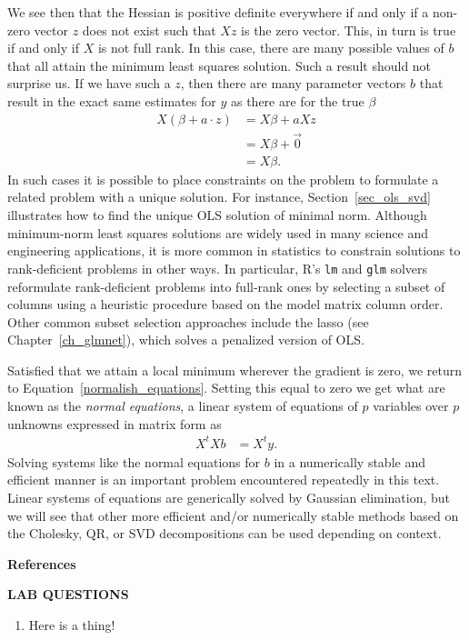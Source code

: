 \documentclass[12pt,hidelinks]{article}
\newcommand{\code}[1]{\texttt{#1}}
\numberwithin{equation}{section}
\begin{document}
We see then that the Hessian is positive definite everywhere if
and only if a non-zero vector $z$ does not exist such that $Xz$
is the zero vector. This, in turn is true if and only if $X$ is not
full rank. In this case, there are many possible values of $b$ that
all attain the minimum least squares solution. Such a result should
not surprise us. If we have such a $z$, then there are many parameter
vectors $b$ that result in the exact same estimates for $y$ as there
are for the true $\beta$
\begin{align}
X (\beta + a \cdot z) &= X \beta + a X z \\
&= X \beta + \vec{0} \\
&= X \beta.
\end{align}
In such cases it is
possible to place constraints on the problem to formulate a related
problem with a unique solution. For instance, Section~\ref{sec_ols_svd}
illustrates how to find the unique OLS solution of minimal norm.
Although minimum-norm least squares solutions are widely used in many science
and engineering applications, it is more common in statistics to constrain
solutions to rank-deficient problems in other ways. In particular, R's
\code{lm} and \code{glm} solvers reformulate rank-deficient problems into
full-rank ones by selecting a subset of columns using a heuristic procedure
based on the model matrix column order. Other common subset selection
approaches include the lasso (see Chapter~\ref{ch_glmnet}), which solves a
penalized version of OLS.


Satisfied that we attain a local minimum wherever the gradient is zero,
we return to Equation~\ref{normalish_equations}. Setting this
equal to zero we get what are known as the \textit{normal equations},
a linear system of equations of $p$ variables over $p$ unknowns
expressed in matrix form as
\begin{align}
X^t X b &= X^t y. \label{norm_eq}
\end{align}
Solving systems like the normal equations for $b$ in a numerically stable and
efficient manner is an important problem encountered repeatedly in this text.
Linear systems of equations are generically solved by Gaussian
elimination, but we will see that other more efficient and/or numerically
stable methods based on the Cholesky, QR, or SVD decompositions can be
used depending on context.



\renewcommand{\section}[2]{}%
\vspace{12pt}
\textbf{References}


\newpage

\textbf{LAB QUESTIONS}

\vspace*{0pt}

\begin{enumerate}
\item Here is a thing!
\end{enumerate}
\end{document}

